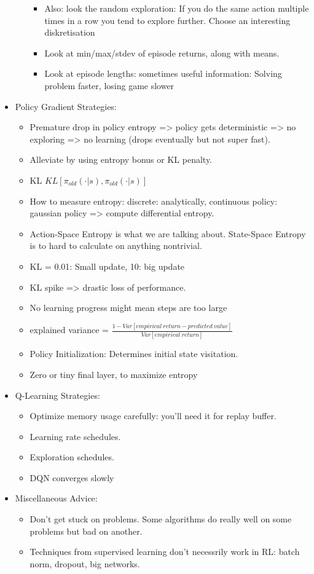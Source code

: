 \begin{itemize}[noitemsep,nolistsep]
\begin{itemize}
\begin{itemize}[noitemsep,nolistsep]
			\item Also: look the random exploration: If you do the same action multiple times in a row you tend to explore further. Choose an interesting diskretisation
			\item Look at min/max/stdev of episode returns, along with means.
			\item Look at episode lengths: sometimes useful information: Solving problem faster, losing game slower
		\end{itemize}
	\end{itemize}
	\item Policy Gradient Strategies:
	\begin{itemize}[noitemsep,nolistsep]
		\item Premature drop in policy entropy => policy gets deterministic => no exploring => no learning (drops eventually but not super fast).
		\item Alleviate by using entropy bonus or KL penalty. 
		\item KL $KL[\pi_{old}(\cdot|s), \pi_{old}(\cdot|s)]$
		\item How to measure entropy: discrete: analytically, continuous policy: gaussian policy => compute differential entropy.
		\item Action-Space Entropy is what we are talking about. State-Space Entropy is to hard to calculate on anything nontrivial.
		\item KL = 0.01: Small update, 10: big update
		\item KL spike => drastic loss of performance.
		\item No learning progress might mean steps are too large
		\item explained variance = $\frac{1 - Var[empirical\ return - predicted\ value]}{Var[empirical\ return]}$
		\item Policy Initialization: Determines initial state visitation.
		\item Zero or tiny final layer, to maximize entropy
	\end{itemize}
	\item Q-Learning Strategies:
	\begin{itemize}[noitemsep,nolistsep]
		\item Optimize memory usage carefully: you'll need it for replay buffer.
		\item Learning rate schedules.
		\item Exploration schedules.
		\item DQN converges slowly
	\end{itemize}
	\item Miscellaneous Advice:
	\begin{itemize}[noitemsep,nolistsep]
		\item Don't get stuck on problems. Some algorithms do really well on some problems but bad on another.
		\item Techniques from supervised learning don't necessrily work in RL: batch norm, dropout, big networks.
	\end{itemize}
\end{itemize}


